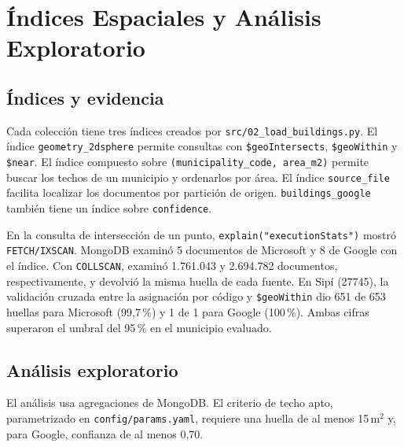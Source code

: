 \section{Índices Espaciales y Análisis Exploratorio}

\subsection{Índices y evidencia}
Cada colección tiene tres índices creados por \texttt{src/02\_load\_buildings.py}. El índice \texttt{geometry\_2dsphere} permite consultas con \texttt{\$geoIntersects}, \texttt{\$geoWithin} y \texttt{\$near}. El índice compuesto sobre \texttt{(municipality\_code, area\_m2)} permite buscar los techos de un municipio y ordenarlos por área. El índice \texttt{source\_file} facilita localizar los documentos por partición de origen. \texttt{buildings\_google} también tiene un índice sobre \texttt{confidence}.

\begin{table}[H]
\centering
\footnotesize
\resizebox{\linewidth}{!}{}
\caption{Planes de ejecución con índice y con recorrido completo.}
\label{tab:evidencia_edificios}
\end{table}

En la consulta de intersección de un punto, \texttt{explain("executionStats")} mostró \texttt{FETCH/IXSCAN}. MongoDB examinó 5 documentos de Microsoft y 8 de Google con el índice. Con \texttt{COLLSCAN}, examinó 1.761.043 y 2.694.782 documentos, respectivamente, y devolvió la misma huella de cada fuente. En Sipí (27745), la validación cruzada entre la asignación por código y \texttt{\$geoWithin} dio 651 de 653 huellas para Microsoft (99,7\,\%) y 1 de 1 para Google (100\,\%). Ambas cifras superaron el umbral del 95\,\% en el municipio evaluado.

\subsection{Análisis exploratorio}
El análisis usa agregaciones de MongoDB. El criterio de techo apto, parametrizado en \texttt{config/params.yaml}, requiere una huella de al menos 15\,m$^2$ y, para Google, confianza de al menos 0,70.

\begin{table}[H]
\centering
\footnotesize
\resizebox{\linewidth}{!}{}
\caption{Resumen de huellas y techos aptos por fuente.}
\end{table}

